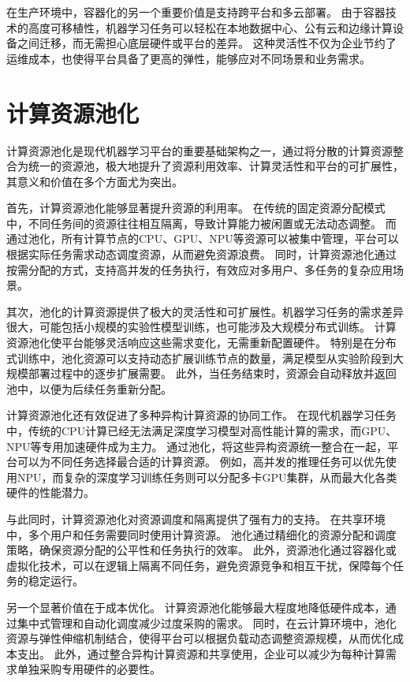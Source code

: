 在生产环境中，容器化的另一个重要价值是支持跨平台和多云部署。
由于容器技术的高度可移植性，机器学习任务可以轻松在本地数据中心、公有云和边缘计算设备之间迁移，而无需担心底层硬件或平台的差异。
这种灵活性不仅为企业节约了运维成本，也使得平台具备了更高的弹性，能够应对不同场景和业务需求。


\section{计算资源池化}

计算资源池化是现代机器学习平台的重要基础架构之一，通过将分散的计算资源整合为统一的资源池，极大地提升了资源利用效率、计算灵活性和平台的可扩展性，其意义和价值在多个方面尤为突出。

首先，计算资源池化能够显著提升资源的利用率。
在传统的固定资源分配模式中，不同任务间的资源往往相互隔离，导致计算能力被闲置或无法动态调整。
而通过池化，所有计算节点的CPU、GPU、NPU等资源可以被集中管理，平台可以根据实际任务需求动态调度资源，从而避免资源浪费。
同时，计算资源池化通过按需分配的方式，支持高并发的任务执行，有效应对多用户、多任务的复杂应用场景。

其次，池化的计算资源提供了极大的灵活性和可扩展性。机器学习任务的需求差异很大，可能包括小规模的实验性模型训练，也可能涉及大规模分布式训练。
计算资源池化使平台能够灵活响应这些需求变化，无需重新配置硬件。
特别是在分布式训练中，池化资源可以支持动态扩展训练节点的数量，满足模型从实验阶段到大规模部署过程中的逐步扩展需要。
此外，当任务结束时，资源会自动释放并返回池中，以便为后续任务重新分配。

计算资源池化还有效促进了多种异构计算资源的协同工作。
在现代机器学习任务中，传统的CPU计算已经无法满足深度学习模型对高性能计算的需求，而GPU、NPU等专用加速硬件成为主力。
通过池化，将这些异构资源统一整合在一起，平台可以为不同任务选择最合适的计算资源。
例如，高并发的推理任务可以优先使用NPU，而复杂的深度学习训练任务则可以分配多卡GPU集群，从而最大化各类硬件的性能潜力。

与此同时，计算资源池化对资源调度和隔离提供了强有力的支持。
在共享环境中，多个用户和任务需要同时使用计算资源。
池化通过精细化的资源分配和调度策略，确保资源分配的公平性和任务执行的效率。
此外，资源池化通过容器化或虚拟化技术，可以在逻辑上隔离不同任务，避免资源竞争和相互干扰，保障每个任务的稳定运行。

另一个显著价值在于成本优化。
计算资源池化能够最大程度地降低硬件成本，通过集中式管理和自动化调度减少过度采购的需求。
同时，在云计算环境中，池化资源与弹性伸缩机制结合，使得平台可以根据负载动态调整资源规模，从而优化成本支出。
此外，通过整合异构计算资源和共享使用，企业可以减少为每种计算需求单独采购专用硬件的必要性。

